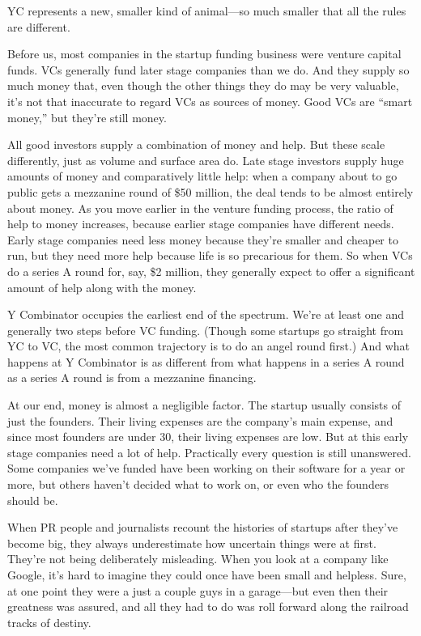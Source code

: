 \documentclass[12pt]{book}
\begin{document}
YC represents a new, smaller kind of animal---so much smaller that all
the rules are different.

Before us, most companies in the startup funding business were venture
capital funds. VCs generally fund later stage companies than we do. And
they supply so much money that, even though the other things they do may
be very valuable, it's not that inaccurate to regard VCs as sources of
money. Good VCs are ``smart money,'' but they're still money.

All good investors supply a combination of money and help. But these
scale differently, just as volume and surface area do. Late stage
investors supply huge amounts of money and comparatively little help:
when a company about to go public gets a mezzanine round of \$50
million, the deal tends to be almost entirely about money. As you move
earlier in the venture funding process, the ratio of help to money
increases, because earlier stage companies have different needs. Early
stage companies need less money because they're smaller and cheaper to
run, but they need more help because life is so precarious for them. So
when VCs do a series A round for, say, \$2 million, they generally
expect to offer a significant amount of help along with the money.

Y Combinator occupies the earliest end of the spectrum. We're at least
one and generally two steps before VC funding. (Though some startups go
straight from YC to VC, the most common trajectory is to do an angel
round first.) And what happens at Y Combinator is as different from what
happens in a series A round as a series A round is from a mezzanine
financing.

At our end, money is almost a negligible factor. The startup usually
consists of just the founders. Their living expenses are the company's
main expense, and since most founders are under 30, their living
expenses are low. But at this early stage companies need a lot of help.
Practically every question is still unanswered. Some companies we've
funded have been working on their software for a year or more, but
others haven't decided what to work on, or even who the founders should
be.

When PR people and journalists recount the histories of startups after
they've become big, they always underestimate how uncertain things were
at first. They're not being deliberately misleading. When you look at a
company like Google, it's hard to imagine they could once have been
small and helpless. Sure, at one point they were a just a couple guys in
a garage---but even then their greatness was assured, and all they had
to do was roll forward along the railroad tracks of destiny.
\end{document}
